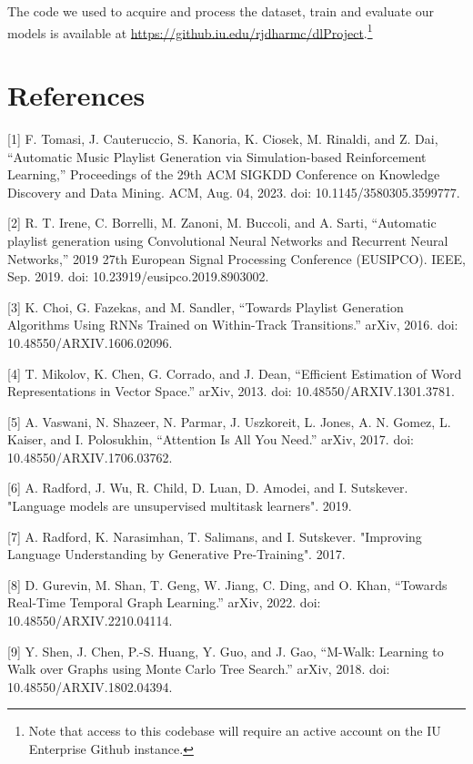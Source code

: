 \documentclass{article}
\begin{document}
The code we used to acquire and process the dataset, train and evaluate our models is available at \url{https://github.iu.edu/rjdharmc/dlProject}.\footnote{Note that access to this codebase will require an active account on the IU Enterprise Github instance.}

\section*{References}

{
	\small
	
	
	[1] F. Tomasi, J. Cauteruccio, S. Kanoria, K. Ciosek, M. Rinaldi, and Z. Dai, “Automatic Music Playlist Generation via Simulation-based Reinforcement Learning,” Proceedings of the 29th ACM SIGKDD Conference on Knowledge Discovery and Data Mining. ACM, Aug. 04, 2023. doi: 10.1145/3580305.3599777. 
	
	[2] R. T. Irene, C. Borrelli, M. Zanoni, M. Buccoli, and A. Sarti, “Automatic playlist generation using Convolutional Neural Networks and Recurrent Neural Networks,” 2019 27th European Signal Processing Conference (EUSIPCO). IEEE, Sep. 2019. doi: 10.23919/eusipco.2019.8903002. 
	
	[3] K. Choi, G. Fazekas, and M. Sandler, “Towards Playlist Generation Algorithms Using RNNs Trained on Within-Track Transitions.” arXiv, 2016. doi: 10.48550/ARXIV.1606.02096. 
	
	[4] T. Mikolov, K. Chen, G. Corrado, and J. Dean, “Efficient Estimation of Word Representations in Vector Space.” arXiv, 2013. doi: 10.48550/ARXIV.1301.3781.
	
	[5] A. Vaswani, N. Shazeer, N. Parmar, J. Uszkoreit, L. Jones, A. N. Gomez, L. Kaiser, and I. Polosukhin, “Attention Is All You Need.” arXiv, 2017. doi: 10.48550/ARXIV.1706.03762.
	
	[6] A. Radford, J. Wu, R. Child, D. Luan, D. Amodei, and I. Sutskever. "Language models are unsupervised multitask learners". 2019.
	
	[7] A. Radford, K. Narasimhan, T. Salimans, and I. Sutskever. "Improving Language Understanding by Generative Pre-Training". 2017.
	
	[8] D. Gurevin, M. Shan, T. Geng, W. Jiang, C. Ding, and O. Khan, “Towards Real-Time Temporal Graph Learning.” arXiv, 2022. doi: 10.48550/ARXIV.2210.04114. 
	
	[9] Y. Shen, J. Chen, P.-S. Huang, Y. Guo, and J. Gao, “M-Walk: Learning to Walk over Graphs using Monte Carlo Tree Search.” arXiv, 2018. doi: 10.48550/ARXIV.1802.04394.
}
\end{document}
